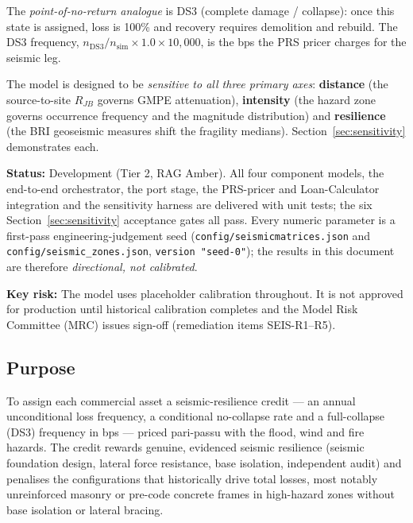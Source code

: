 \documentclass[11pt,a4paper]{article}
\begin{document}
The \emph{point-of-no-return analogue} is DS3 (complete damage / collapse): once
this state is assigned, loss is 100\% and recovery requires demolition and
rebuild. The DS3 frequency, $n_{\text{DS3}}/n_{\text{sim}} \times 1.0 \times
10{,}000$, is the bps the PRS pricer charges for the seismic leg.

The model is designed to be \emph{sensitive to all three primary axes}:
\textbf{distance} (the source-to-site $R_{JB}$ governs GMPE attenuation),
\textbf{intensity} (the hazard zone governs occurrence frequency and the
magnitude distribution) and \textbf{resilience} (the BRI geoseismic measures
shift the fragility medians). Section~\ref{sec:sensitivity} demonstrates each.

\textbf{Status:} Development (Tier 2, RAG Amber). All four component models, the
end-to-end orchestrator, the port stage, the PRS-pricer and Loan-Calculator
integration and the sensitivity harness are delivered with unit tests; the six
Section~\ref{sec:sensitivity} acceptance gates all pass. Every numeric parameter
is a first-pass engineering-judgement seed (\texttt{config/seismicmatrices.json}
and \texttt{config/seismic\_zones.json}, \texttt{version "seed-0"}); the results
in this document are therefore \emph{directional, not calibrated}.

\textbf{Key risk:} The model uses placeholder calibration throughout. It is not
approved for production until historical calibration completes and the Model Risk
Committee (MRC) issues sign-off (remediation items SEIS-R1--R5).

\mkmpurpose

\subsection{Purpose}
To assign each commercial asset a seismic-resilience credit --- an annual
unconditional loss frequency, a conditional no-collapse rate and a full-collapse
(DS3) frequency in bps --- priced pari-passu with the flood, wind and fire
hazards. The credit rewards genuine, evidenced seismic resilience (seismic
foundation design, lateral force resistance, base isolation, independent audit)
and penalises the configurations that historically drive total losses, most
notably unreinforced masonry or pre-code concrete frames in high-hazard zones
without base isolation or lateral bracing.
\end{document}
